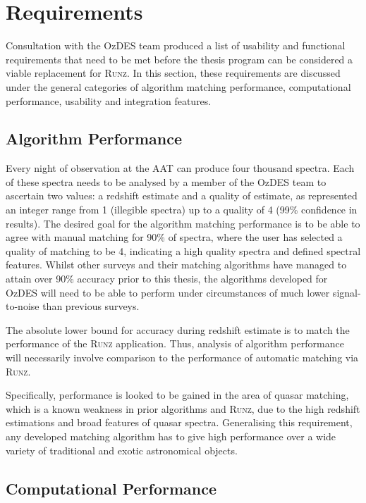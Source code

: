 \documentclass[titlesmallcaps, examinerscopy, copyrightpage]{uqthesis}
\begin{document}

\chapter{Requirements}
\label{ch:req}

Consultation with the OzDES team produced a list of usability and functional requirements that need to be met before the thesis program can be considered a viable replacement for \textsc{Runz}. In this section, these requirements are discussed under the general categories of algorithm matching performance, computational performance, usability and integration features.
\section{Algorithm Performance}

Every night of observation at the AAT can produce four thousand spectra. Each of these spectra needs to be analysed by a member of the OzDES team to ascertain two values: a redshift estimate and a quality of estimate, as represented an integer range from 1 (illegible spectra) up to a quality of 4 (99\% confidence in results). The desired goal for the algorithm matching performance is to be able to agree with manual matching for 90\% of spectra, where the user has selected a quality of matching to be 4, indicating a high quality spectra and defined spectral features. Whilst other surveys and their matching algorithms have managed to attain over 90\% accuracy prior to this thesis, the algorithms developed for OzDES will need to be able to perform under circumstances of much lower signal-to-noise than previous surveys.

The absolute lower bound for accuracy during redshift estimate is to match the performance of the \textsc{Runz} application. Thus, analysis of algorithm performance will necessarily involve comparison to the performance of automatic matching via \textsc{Runz}.

Specifically, performance is looked to be gained in the area of quasar matching, which is a known weakness in prior algorithms and \textsc{Runz}, due to the high redshift estimations and broad features of quasar spectra. Generalising this requirement, any developed matching algorithm has to give high performance over a wide variety of traditional and exotic astronomical objects.

\section{Computational Performance}
\end{document}

